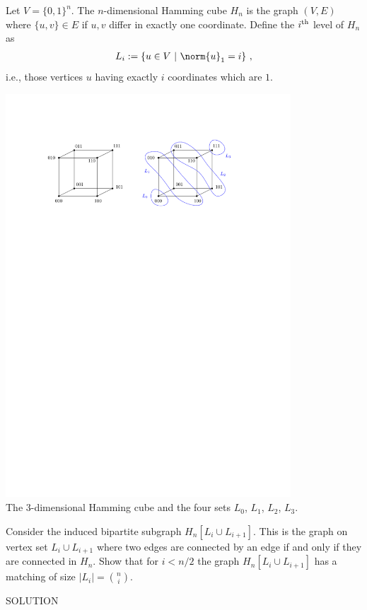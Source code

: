 \documentclass[11pt,a4paper,oneside]{article}
\newcommand{\nth}[1]{#1\textsuperscript{th}}
\begin{document}
Let $V = \{0,1\}^n$. The $n$-dimensional Hamming cube $H_n$ is the graph $(V,E)$ where
$\{u,v\} \in E$ if $u,v$ differ in exactly one coordinate.
Define the $\nth{i}$ level of $H_n$ as 
\begin{align*}
  L_i := \{u \in V \ | \ \norm{u}_1 = i \} \ ,
\end{align*}
i.e., those vertices $u$ having exactly $i$ coordinates which are $1$.
\begin{center}
  \includegraphics[width=0.8\textwidth]{figures/hamming-3-dim.pdf}\\
  {\small The $3$-dimensional Hamming cube and the four 
    sets $L_0$, $L_1$, $L_2$, $L_3$.}
\end{center}


\begin{problem}{4}
  \statement
  Consider the induced bipartite subgraph $H_n[ L_i \cup L_{i+1}]$. This is 
  the graph on vertex set $L_i \cup L_{i+1}$ where two edges are connected
  by an edge if and only if they are connected in $H_n$.
  Show that for $i < n/2$ the graph $H_n[ L_i \cup L_{i+1}]$
  has a matching of size $|L_i| = {n \choose i}$.
  
  \solution
  SOLUTION
\end{problem}
\end{document}

